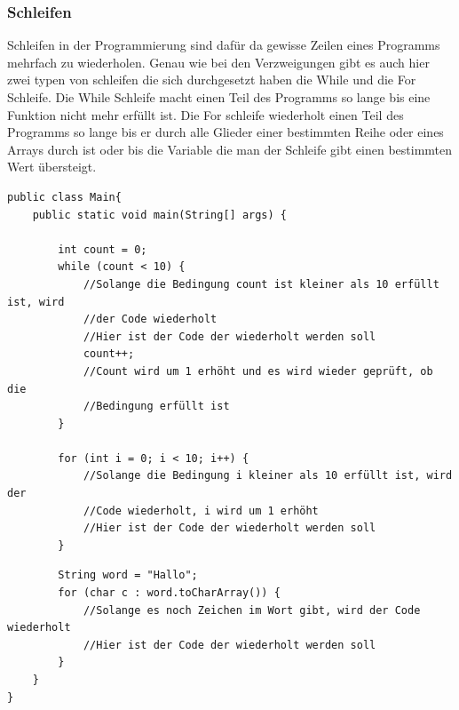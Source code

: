 \subsubsection{Schleifen}
Schleifen in der Programmierung sind dafür da gewisse Zeilen eines Programms mehrfach zu wiederholen. Genau wie bei den Verzweigungen gibt es auch hier zwei typen von schleifen die sich durchgesetzt haben die While und die For Schleife. Die While Schleife macht einen Teil des Programms so lange bis eine Funktion nicht mehr erfüllt ist. Die For schleife wiederholt einen Teil des Programms so lange bis er durch alle Glieder einer bestimmten Reihe oder eines Arrays durch ist oder bis die Variable die man der Schleife gibt einen bestimmten Wert übersteigt\cite{freecodecamporg_android_2020}.
\begin{verbatim}
public class Main{
    public static void main(String[] args) {
        
        int count = 0;
        while (count < 10) {
            //Solange die Bedingung count ist kleiner als 10 erfüllt ist, wird
            //der Code wiederholt
            //Hier ist der Code der wiederholt werden soll
            count++;
            //Count wird um 1 erhöht und es wird wieder geprüft, ob die 
            //Bedingung erfüllt ist
        }
        
        for (int i = 0; i < 10; i++) {
            //Solange die Bedingung i kleiner als 10 erfüllt ist, wird der 
            //Code wiederholt, i wird um 1 erhöht
            //Hier ist der Code der wiederholt werden soll
        }
\end{verbatim}
\newpage
\begin{verbatim}
        String word = "Hallo";
        for (char c : word.toCharArray()) {
            //Solange es noch Zeichen im Wort gibt, wird der Code wiederholt
            //Hier ist der Code der wiederholt werden soll
        }
    }
}
\end{verbatim}

